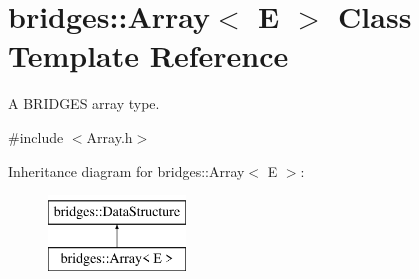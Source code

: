\hypertarget{classbridges_1_1_array}{}\section{bridges\+::Array$<$ E $>$ Class Template Reference}
\label{classbridges_1_1_array}


A B\+R\+I\+D\+G\+ES array type.  




{\ttfamily \#include $<$Array.\+h$>$}

Inheritance diagram for bridges\+::Array$<$ E $>$\+:\begin{figure}[H]
\begin{center}
\leavevmode
\includegraphics[height=2.000000cm]{classbridges_1_1_array}
\end{center}
\end{figure}
